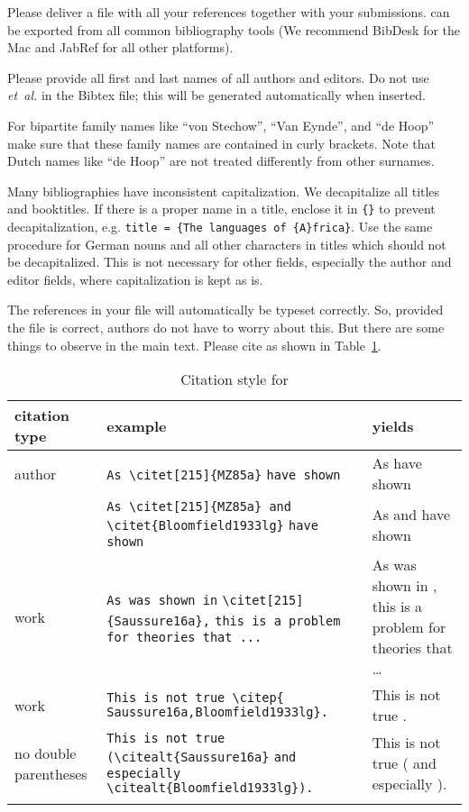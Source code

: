 {Please deliver a \bibtex file with all your references together with your submissions. 
\bibtex can be exported from all common bibliography tools (We recommend BibDesk for the Mac and JabRef for all other platforms). 

Please provide all first and last names of all authors and editors. Do not use {\em et~al.}  in the Bibtex file; this will be generated automatically when inserted.

For bipartite family names like ``von Stechow'', ``Van Eynde'', and ``de Hoop'' make sure that these
family names are contained in curly brackets.
 Note that Dutch names like ``de Hoop'' are not treated differently from other surnames.

Many bibliographies have inconsistent capitalization. We decapitalize all titles and booktitles. If there is a proper name in a title, enclose it in \verb+{}+ to prevent decapitalization, e.g. \verb+title = {The languages of {A}frica}+. Use the same procedure for German nouns and all other characters in titles which should not be decapitalized. This is not necessary for other fields, especially the author and editor fields, where capitalization is kept as is.

The references in your \bibtex file will automatically be typeset correctly. So, provided the
\bibtex file is correct, authors do not have to worry about this. But there are some things to
observe in the main text. Please cite as shown in Table~\ref{tab-citation}.

\begin{table}[htbp]
\caption{Citation style for \lsp}%
\label{tab-citation}
\begin{tabular}{p{1.8cm}>{\small}p{6.2cm}p{4cm}}
\lsptoprule
citation type & example &yields\\
\midrule
author & \raggedright \verb+As \citet[215]{MZ85a}+
	  \verb+have shown+             &As \citet[215]{MZ85a} have shown\\ 
       & \raggedright  \verb+As \citet[215]{MZ85a} and+
	  \verb+\citet{Bloomfield1933lg}+
	  \verb+have shown+ 
					  &  As \citet[215]{MZ85a} and \citet{Bloomfield1933lg} have shown\\ 
work   & \raggedright  \verb+As was shown in+ 
	  \verb+\citet[215]{Saussure16a},+
	  \verb+this is a problem for theories that ...+ & As was shown in \citet[215]{Saussure16a}, this is a problem for theories that \ldots\\ 
work   & \raggedright  \verb+This is not true \citep{+  
	  \verb+Saussure16a,Bloomfield1933lg}.+ & This is not true \citep{Saussure16a,Bloomfield1933lg}.\\[2em]
no double parentheses   & \raggedright \verb+This is not true+
			    \verb+(\citealt{Saussure16a}+
			    \verb+and especially+
			    \verb+\citealt{Bloomfield1933lg}).+& This is not true (\citealt{Saussure16a} and especially \citealt{Bloomfield1933lg}).\\
\lspbottomrule
\end{tabular}
\end{table}
\nocite{Bresnan82b}%

}
